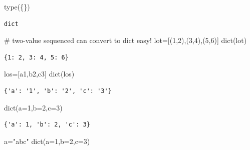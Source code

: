 \documentclass[
  a4paper,
  DIV=11,
  numbers=noendperiod]{scrreprt}
\newenvironment{Shaded}{\begin{snugshade}}{\end{snugshade}}
\newcommand{\BuiltInTok}[1]{\textcolor[rgb]{0.00,0.23,0.31}{#1}}
\newcommand{\CommentTok}[1]{\textcolor[rgb]{0.37,0.37,0.37}{#1}}
\newcommand{\DecValTok}[1]{\textcolor[rgb]{0.68,0.00,0.00}{#1}}
\newcommand{\NormalTok}[1]{\textcolor[rgb]{0.00,0.23,0.31}{#1}}
\newcommand{\OperatorTok}[1]{\textcolor[rgb]{0.37,0.37,0.37}{#1}}
\newcommand{\StringTok}[1]{\textcolor[rgb]{0.13,0.47,0.30}{#1}}
\begin{document}
\begin{Shaded}
\begin{Highlighting}[]
\BuiltInTok{type}\NormalTok{(\{\})}
\end{Highlighting}
\end{Shaded}

\begin{verbatim}
dict
\end{verbatim}

\begin{Shaded}
\begin{Highlighting}[]
\CommentTok{\# two{-}value sequenced can convert to dict easy!}
\NormalTok{lot}\OperatorTok{=}\NormalTok{[(}\DecValTok{1}\NormalTok{,}\DecValTok{2}\NormalTok{),(}\DecValTok{3}\NormalTok{,}\DecValTok{4}\NormalTok{),(}\DecValTok{5}\NormalTok{,}\DecValTok{6}\NormalTok{)]}
\BuiltInTok{dict}\NormalTok{(lot)}
\end{Highlighting}
\end{Shaded}

\begin{verbatim}
{1: 2, 3: 4, 5: 6}
\end{verbatim}

\begin{Shaded}
\begin{Highlighting}[]
\NormalTok{los}\OperatorTok{=}\NormalTok{[}\StringTok{\textquotesingle{}a1\textquotesingle{}}\NormalTok{,}\StringTok{\textquotesingle{}b2\textquotesingle{}}\NormalTok{,}\StringTok{\textquotesingle{}c3\textquotesingle{}}\NormalTok{]}
\BuiltInTok{dict}\NormalTok{(los)}
\end{Highlighting}
\end{Shaded}

\begin{verbatim}
{'a': '1', 'b': '2', 'c': '3'}
\end{verbatim}

\begin{Shaded}
\begin{Highlighting}[]
\BuiltInTok{dict}\NormalTok{(a}\OperatorTok{=}\DecValTok{1}\NormalTok{,b}\OperatorTok{=}\DecValTok{2}\NormalTok{,c}\OperatorTok{=}\DecValTok{3}\NormalTok{)}
\end{Highlighting}
\end{Shaded}

\begin{verbatim}
{'a': 1, 'b': 2, 'c': 3}
\end{verbatim}

\begin{Shaded}
\begin{Highlighting}[]
\NormalTok{a}\OperatorTok{=}\StringTok{"abc"}
\BuiltInTok{dict}\NormalTok{(a}\OperatorTok{=}\DecValTok{1}\NormalTok{,b}\OperatorTok{=}\DecValTok{2}\NormalTok{,c}\OperatorTok{=}\DecValTok{3}\NormalTok{)}
\end{Highlighting}
\end{Shaded}
\end{document}
